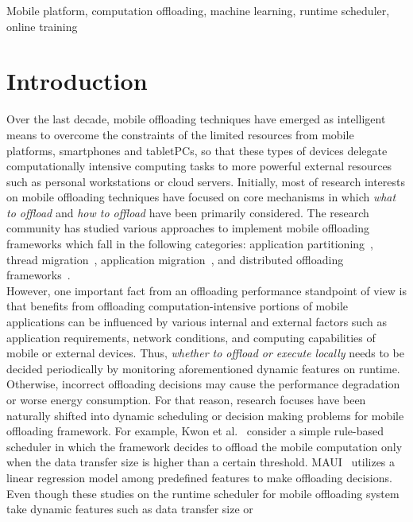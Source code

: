\documentclass[10pt, conference, compsocconf]{IEEEtran}
\begin{document}
\begin{IEEEkeywords}
Mobile platform, computation offloading, machine learning, runtime
scheduler, online training
\end{IEEEkeywords}

\section{Introduction}
%
Over the last decade, mobile offloading techniques have emerged as
intelligent means to overcome the constraints of the limited resources
from mobile platforms, smartphones and tabletPCs, so that these types of
devices delegate computationally intensive computing tasks to more
powerful external resources such as personal workstations or cloud
servers.
%
Initially, most of research interests on mobile offloading techniques
have focused on core mechanisms in which \textit{what to offload} and
\textit{how to offload} have been primarily considered. 
%
The research community has studied various approaches to implement mobile
offloading frameworks which fall in the following categories:
application partitioning~\cite{spectra, maui, cuckoo}, thread
migration~\cite{clonecloud, comet}, application migration~\cite{hung},
and distributed offloading frameworks~\cite{mmr, serendipity}.\\
%
\indent However, one important fact from an offloading performance
standpoint of view is that benefits from offloading
computation-intensive portions of mobile applications can be influenced
by various internal and external factors such as application
requirements, network conditions, and computing capabilities of mobile
or external devices.
%
Thus, \textit{whether to offload or execute locally} needs to be
decided periodically by monitoring aforementioned dynamic features on
runtime.
%
Otherwise, incorrect offloading decisions may cause the performance
degradation or worse energy consumption.
%
For that reason, research focuses have been naturally shifted into
dynamic scheduling or decision making problems for mobile offloading
framework.
%
For example, Kwon et al.~\cite{kwon} consider a simple rule-based
scheduler in which the framework decides to offload the mobile
computation only when the data transfer size is higher than a certain
threshold.
%
MAUI~\cite{maui} utilizes a linear regression model among predefined
features to make offloading decisions.\\
%
\indent Even though these studies on the runtime scheduler for mobile
offloading system take dynamic features such as data transfer size or
\end{document}

